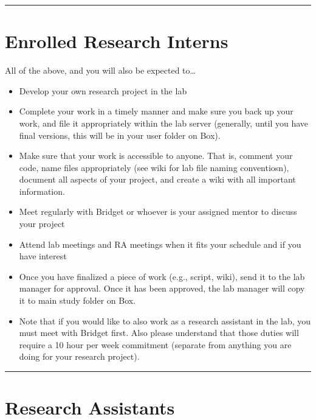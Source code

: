 \documentclass[
]{book}
\providecommand{\tightlist}{%
  \setlength{\itemsep}{0pt}\setlength{\parskip}{0pt}}
\begin{document}
\begin{center}\rule{0.5\linewidth}{0.5pt}\end{center}

\hypertarget{enrolled-research-interns}{%
\section{Enrolled Research Interns}\label{enrolled-research-interns}}

All of the above, and you will also be expected to\ldots{}

\begin{itemize}
\tightlist
\item
  Develop your own research project in the lab
\item
  Complete your work in a timely manner and make sure you back up your work, and file it appropriately within the lab server (generally, until you have final versions, this will be in your user folder on Box).
\item
  Make sure that your work is accessible to anyone. That is, comment your code, name files appropriately (see wiki for lab file naming conventiosn), document all aspects of your project, and create a wiki with all important information.\\
\item
  Meet regularly with Bridget or whoever is your assigned mentor to discuss your project
\item
  Attend lab meetings and RA meetings when it fits your schedule and if you have interest
\item
  Once you have finalized a piece of work (e.g., script, wiki), send it to the lab manager for approval. Once it has been approved, the lab manager will copy it to main study folder on Box.
\item
  Note that if you would like to also work as a research assistant in the lab, you must meet with Bridget first. Also please understand that those duties will require a 10 hour per week commitment (separate from anything you are doing for your research project).
\end{itemize}

\begin{center}\rule{0.5\linewidth}{0.5pt}\end{center}

\hypertarget{research-assistants}{%
\section{Research Assistants}\label{research-assistants}}
\end{document}
